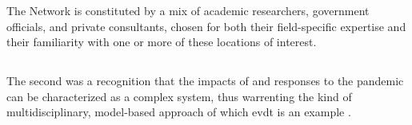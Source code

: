 The Network is constituted by a mix of academic researchers, government officials, and private consultants, chosen for both their field-specific expertise and their familiarity with one or more of these locations of interest.

\subsubsection{}

\subsubsection{}

\subsubsection{}

\subsubsection{}

\subsection{} \label{sec:vida-saf-result}

\subsubsection{}


The second was a recognition that the impacts of and responses to the pandemic can be characterized as a complex system, thus warrenting the kind of multidisciplinary, model-based approach of which \ac{evdt} is an example \cite{deweckHandlingCOVID192020}.



\subsubsection{}

\subsubsection{}

